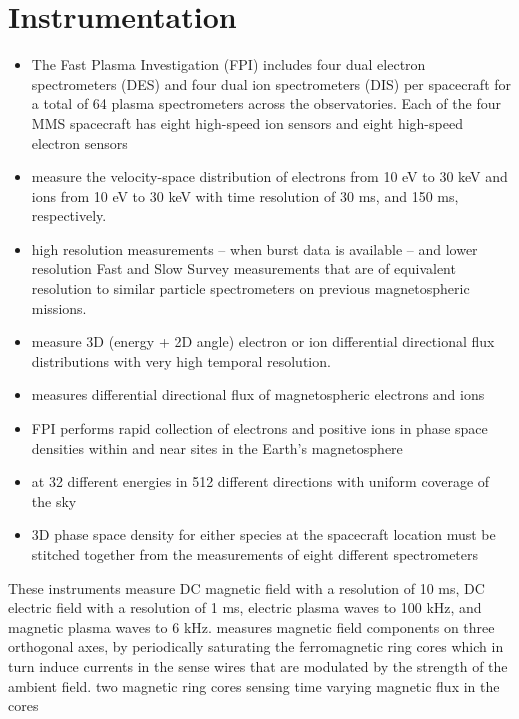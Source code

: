 \section{Instrumentation}
\begin{itemize}
    \item The Fast Plasma Investigation (FPI) includes four dual electron spectrometers (DES) and four dual ion spectrometers (DIS) per spacecraft for a total of 64 plasma spectrometers across the observatories. Each of the four MMS spacecraft has eight high-speed ion sensors and eight high-speed electron sensors
    \item measure the velocity-space distribution of electrons from 10 eV to 30 keV and ions from 10 eV to 30 keV with time resolution of 30 ms, and 150 ms, respectively.
    \item high resolution measurements – when burst data is available – and lower resolution Fast and Slow Survey measurements that are of equivalent resolution to similar particle spectrometers on previous magnetospheric missions.
    \item measure 3D (energy + 2D angle) electron or ion differential directional flux distributions with very high temporal resolution.
    \item measures differential directional flux of magnetospheric electrons and ions
    \item FPI performs rapid collection of electrons and positive ions in phase space densities within and near sites in the Earth’s magnetosphere
    \item at 32 different energies in 512 different directions with uniform coverage of the sky
    \item 3D phase space density for either species at the spacecraft location must be stitched together from the measurements of eight different spectrometers
\end{itemize}

These instruments measure DC magnetic field with a resolution of 10 ms, DC electric field with a resolution of 1 ms, electric plasma waves to 100 kHz, and magnetic plasma waves to 6 kHz. 
measures magnetic field components on three orthogonal axes, by periodically saturating the ferromagnetic ring cores which in turn induce currents in the sense wires that are modulated by the strength of the ambient field.
two magnetic ring cores sensing time varying magnetic flux in the cores


